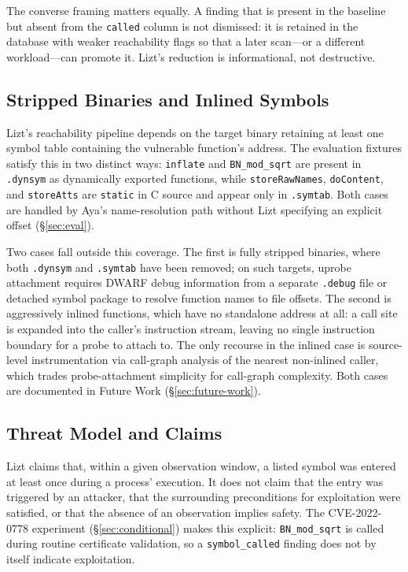\documentclass[conference]{IEEEtran}
\begin{document}
The converse framing matters equally. A finding that is present in the baseline but absent from the \texttt{called} column is not dismissed: it is retained in the database with weaker reachability flags so that a later scan---or a different workload---can promote it. Lizt's reduction is informational, not destructive.

\subsection{Stripped Binaries and Inlined Symbols}
\label{sec:static-inlined}

Lizt's reachability pipeline depends on the target binary retaining at least one symbol table containing the vulnerable function's address. The evaluation fixtures satisfy this in two distinct ways: \texttt{inflate} and \texttt{BN\_mod\_sqrt} are present in \texttt{.dynsym} as dynamically exported functions, while \texttt{storeRawNames}, \texttt{doContent}, and \texttt{storeAtts} are \texttt{static} in C source and appear only in \texttt{.symtab}. Both cases are handled by Aya's name-resolution path without Lizt specifying an explicit offset (\S\ref{sec:eval}).

Two cases fall outside this coverage. The first is fully stripped binaries, where both \texttt{.dynsym} and \texttt{.symtab} have been removed; on such targets, uprobe attachment requires DWARF debug information from a separate \texttt{.debug} file or detached symbol package to resolve function names to file offsets. The second is aggressively inlined functions, which have no standalone address at all: a call site is expanded into the caller's instruction stream, leaving no single instruction boundary for a probe to attach to. The only recourse in the inlined case is source-level instrumentation via call-graph analysis of the nearest non-inlined caller, which trades probe-attachment simplicity for call-graph complexity. Both cases are documented in Future Work (\S\ref{sec:future-work}).

\subsection{Threat Model and Claims}
\label{sec:threat-model}

Lizt claims that, within a given observation window, a listed symbol was entered at least once during a process' execution. It does not claim that the entry was triggered by an attacker, that the surrounding preconditions for exploitation were satisfied, or that the absence of an observation implies safety. The CVE-2022-0778 experiment (\S\ref{sec:conditional}) makes this explicit: \texttt{BN\_mod\_sqrt} is called during routine certificate validation, so a \texttt{symbol\_called} finding does not by itself indicate exploitation.
\end{document}
